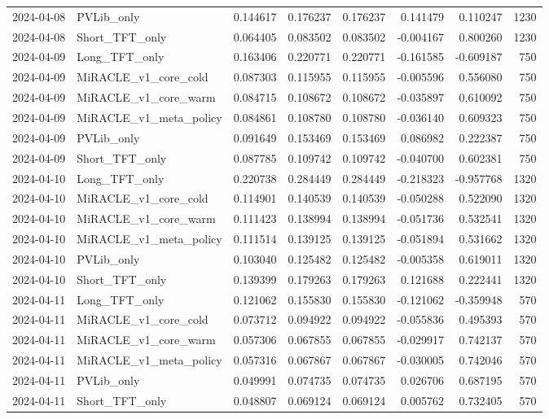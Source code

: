 \begin{tabular}{llrrrrrr}
2024-04-08 & PVLib_only & 0.144617 & 0.176237 & 0.176237 & 0.141479 & 0.110247 & 1230 \\
2024-04-08 & Short_TFT_only & 0.064405 & 0.083502 & 0.083502 & -0.004167 & 0.800260 & 1230 \\
2024-04-09 & Long_TFT_only & 0.163406 & 0.220771 & 0.220771 & -0.161585 & -0.609187 & 750 \\
2024-04-09 & MiRACLE_v1_core_cold & 0.087303 & 0.115955 & 0.115955 & -0.005596 & 0.556080 & 750 \\
2024-04-09 & MiRACLE_v1_core_warm & 0.084715 & 0.108672 & 0.108672 & -0.035897 & 0.610092 & 750 \\
2024-04-09 & MiRACLE_v1_meta_policy & 0.084861 & 0.108780 & 0.108780 & -0.036140 & 0.609323 & 750 \\
2024-04-09 & PVLib_only & 0.091649 & 0.153469 & 0.153469 & 0.086982 & 0.222387 & 750 \\
2024-04-09 & Short_TFT_only & 0.087785 & 0.109742 & 0.109742 & -0.040700 & 0.602381 & 750 \\
2024-04-10 & Long_TFT_only & 0.220738 & 0.284449 & 0.284449 & -0.218323 & -0.957768 & 1320 \\
2024-04-10 & MiRACLE_v1_core_cold & 0.114901 & 0.140539 & 0.140539 & -0.050288 & 0.522090 & 1320 \\
2024-04-10 & MiRACLE_v1_core_warm & 0.111423 & 0.138994 & 0.138994 & -0.051736 & 0.532541 & 1320 \\
2024-04-10 & MiRACLE_v1_meta_policy & 0.111514 & 0.139125 & 0.139125 & -0.051894 & 0.531662 & 1320 \\
2024-04-10 & PVLib_only & 0.103040 & 0.125482 & 0.125482 & -0.005358 & 0.619011 & 1320 \\
2024-04-10 & Short_TFT_only & 0.139399 & 0.179263 & 0.179263 & 0.121688 & 0.222441 & 1320 \\
2024-04-11 & Long_TFT_only & 0.121062 & 0.155830 & 0.155830 & -0.121062 & -0.359948 & 570 \\
2024-04-11 & MiRACLE_v1_core_cold & 0.073712 & 0.094922 & 0.094922 & -0.055836 & 0.495393 & 570 \\
2024-04-11 & MiRACLE_v1_core_warm & 0.057306 & 0.067855 & 0.067855 & -0.029917 & 0.742137 & 570 \\
2024-04-11 & MiRACLE_v1_meta_policy & 0.057316 & 0.067867 & 0.067867 & -0.030005 & 0.742046 & 570 \\
2024-04-11 & PVLib_only & 0.049991 & 0.074735 & 0.074735 & 0.026706 & 0.687195 & 570 \\
2024-04-11 & Short_TFT_only & 0.048807 & 0.069124 & 0.069124 & 0.005762 & 0.732405 & 570 \\

\end{tabular}
